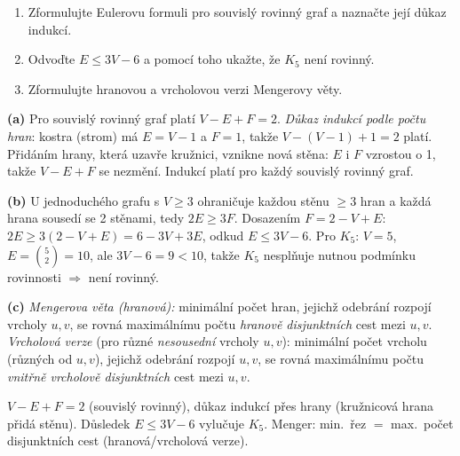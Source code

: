 \begin{zadani}
\begin{enumerate}[label=(\alph*)]
  \item {} Zformulujte Eulerovu formuli pro souvislý rovinný graf a naznačte její důkaz indukcí.
  \item {} Odvoďte $E\le 3V-6$ a pomocí toho ukažte, že $K_5$ není rovinný.
  \item {} Zformulujte hranovou a vrcholovou verzi Mengerovy věty.
\end{enumerate}
\end{zadani}

\begin{reseni}
\textbf{(a)} Pro souvislý rovinný graf platí $V-E+F=2$. \emph{Důkaz indukcí podle počtu hran}: kostra (strom) má $E=V-1$ a $F=1$, takže $V-(V-1)+1=2$ platí. Přidáním hrany, která uzavře kružnici, vznikne nová stěna: $E$ i $F$ vzrostou o 1, takže $V-E+F$ se nezmění. Indukcí platí pro každý souvislý rovinný graf.

\textbf{(b)} U jednoduchého grafu s $V\ge3$ ohraničuje každou stěnu $\ge3$ hran a každá hrana sousedí se 2 stěnami, tedy $2E\ge3F$. Dosazením $F=2-V+E$: $2E\ge3(2-V+E)=6-3V+3E$, odkud $E\le3V-6$. Pro $K_5$: $V=5$, $E=\binom52=10$, ale $3V-6=9<10$, takže $K_5$ nesplňuje nutnou podmínku rovinnosti $\Rightarrow$ není rovinný.

\textbf{(c)} \emph{Mengerova věta (hranová):} minimální počet hran, jejichž odebrání rozpojí vrcholy $u,v$, se rovná maximálnímu počtu \emph{hranově disjunktních} cest mezi $u,v$. \emph{Vrcholová verze} (pro různé \emph{nesousední} vrcholy $u,v$): minimální počet vrcholu (různých od $u,v$), jejichž odebrání rozpojí $u,v$, se rovná maximálnímu počtu \emph{vnitřně vrcholově disjunktních} cest mezi $u,v$.
\end{reseni}

\begin{jadro}
$V-E+F=2$ (souvislý rovinný), důkaz indukcí přes hrany (kružnicová hrana přidá stěnu). Důsledek $E\le3V-6$ vylučuje $K_5$. Menger: min.\ řez $=$ max.\ počet disjunktních cest (hranová/vrcholová verze).
\end{jadro}

